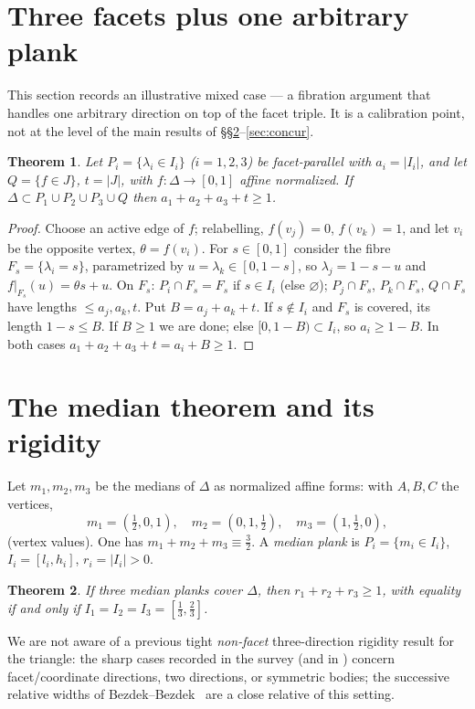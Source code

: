 \documentclass{aims}
\numberwithin{equation}{section}
\theoremstyle{plain}
\newtheorem{theorem}{Theorem}[section]
\theoremstyle{definition}
\theoremstyle{remark}
\begin{document}
\section{Three facets plus one arbitrary plank}\label{sec:3plus1}
This section records an illustrative mixed case --- a fibration argument that
handles one arbitrary direction on top of the facet triple. It is a
calibration point, not at the level of the main results of
\S\S\ref{sec:median}--\ref{sec:concur}.
\begin{theorem}\label{thm:3plus1}
Let $P_i=\{\lambda_i\in I_i\}$ ($i=1,2,3$) be facet-parallel with $a_i=|I_i|$, and
let $Q=\{f\in J\}$, $t=|J|$, with $f:\Delta\to[0,1]$ affine normalized. If
$\Delta\subset P_1\cup P_2\cup P_3\cup Q$ then $a_1+a_2+a_3+t\ge1$.
\end{theorem}
\begin{proof}
Choose an active edge of $f$; relabelling, $f(v_j)=0$, $f(v_k)=1$, and let $v_i$ be
the opposite vertex, $\theta=f(v_i)$. For $s\in[0,1]$ consider the fibre
$F_s=\{\lambda_i=s\}$, parametrized by $u=\lambda_k\in[0,1-s]$, so
$\lambda_j=1-s-u$ and $f|_{F_s}(u)=\theta s+u$. On $F_s$: $P_i\cap F_s=F_s$ if
$s\in I_i$ (else $\varnothing$); $P_j\cap F_s$, $P_k\cap F_s$, $Q\cap F_s$ have
lengths $\le a_j,a_k,t$. Put $B=a_j+a_k+t$. If $s\notin I_i$ and $F_s$ is covered,
its length $1-s\le B$. If $B\ge1$ we are done; else $[0,1-B)\subset I_i$, so
$a_i\ge1-B$. In both cases $a_1+a_2+a_3+t=a_i+B\ge1$.
\end{proof}

\section{The median theorem and its rigidity}\label{sec:median}
Let $m_1,m_2,m_3$ be the medians of $\Delta$ as normalized affine forms: with
$A,B,C$ the vertices,
\[ m_1=(\tfrac12,0,1),\quad m_2=(0,1,\tfrac12),\quad m_3=(1,\tfrac12,0), \]
(vertex values). One has $m_1+m_2+m_3\equiv\tfrac32$. A \emph{median plank} is
$P_i=\{m_i\in I_i\}$, $I_i=[l_i,h_i]$, $r_i=|I_i|>0$.
\begin{theorem}\label{thm:median}
If three median planks cover $\Delta$, then $r_1+r_2+r_3\ge1$, with equality if and
only if $I_1=I_2=I_3=[\tfrac13,\tfrac23]$.
\end{theorem}
We are not aware of a previous tight \emph{non-facet} three-direction rigidity
result for the triangle: the sharp cases recorded in the survey
\cite{Verreault,Bezdek13} (and in \cite{Gardner88,BY26}) concern facet/coordinate
directions, two directions, or symmetric bodies; the successive relative widths
of Bezdek--Bezdek~\cite{BezdekBezdek95} are a close relative of this setting.
\end{document}
